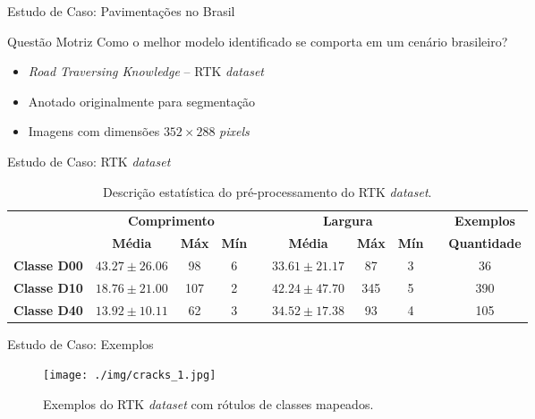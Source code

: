 \begin{frame}{Estudo de Caso: Pavimentações no Brasil}
    \begin{block}{Questão Motriz}
    Como o melhor modelo identificado se comporta em um cenário brasileiro?
    \end{block}
    \pause
    \begin{itemize}
    \item \emph{Road Traversing Knowledge} -- \alert{RTK \emph{dataset}} \cite{Rateke2019}
    \item Anotado originalmente para segmentação
    \item Imagens com dimensões $352 \times 288$ \emph{pixels}
    \end{itemize}
\end{frame}

\begin{frame}{Estudo de Caso: RTK \emph{dataset}}
   \begin{table}[h!]
\begin{center}
\caption{Descrição estatística do pré-processamento do RTK \emph{dataset}.} \label{tab:boundingboxes}
\begin{footnotesize}
\begin{tabular}{cccccccccc}
\toprule
        & \multicolumn{3}{c}{\textbf{Comprimento}} & & \multicolumn{3}{c}{\textbf{Largura}} & & \textbf{Exemplos} \\
        \cmidrule{2-4} \cmidrule{6-8} \cmidrule{10-10}
      &  \textbf{Média} & \textbf{Máx} & \textbf{Mín} & &    \textbf{Média} & \textbf{Máx} & \textbf{Mín} & & \textbf{Quantidade}\\
\midrule
\textbf{Classe D00} & $43.27 \pm 26.06$ & 98 & 6 & & $33.61 \pm 21.17$ & 87 & 3 & & 36\\
\textbf{Classe D10} & $18.76 \pm 21.00$ & 107 & 2 & & $42.24 \pm 47.70$ & 345 & 5 & & 390\\
\textbf{Classe D40} & $13.92 \pm 10.11$ & 62 & 3 & & $34.52 \pm 17.38$ & 93 & 4 & & 105\\
\bottomrule
\end{tabular}
\end{footnotesize}
\end{center}
\end{table}
\end{frame}


\begin{frame}{Estudo de Caso: Exemplos}
    \begin{figure}[h!]
    	\centering
    	\hfill {\texttt{[image: ./img/cracks\_1.jpg]}}
    	\caption{Exemplos do RTK \emph{dataset} com rótulos de classes mapeados.} \label{img:rtk}
    \end{figure}
\end{frame}

